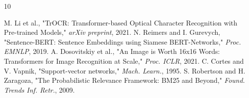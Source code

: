\documentclass[conference]{IEEEtran}
\begin{document}

\begin{thebibliography}{10}

 M. Li et al., "TrOCR: Transformer-based Optical Character Recognition with Pre-trained Models," \textit{arXiv preprint}, 2021.
 N. Reimers and I. Gurevych, "Sentence-BERT: Sentence Embeddings using Siamese BERT-Networks," \textit{Proc. EMNLP}, 2019.
 A. Dosovitskiy et al., "An Image is Worth 16x16 Words: Transformers for Image Recognition at Scale," \textit{Proc. ICLR}, 2021.
 C. Cortes and V. Vapnik, "Support-vector networks," \textit{Mach. Learn.}, 1995.
 S. Robertson and H. Zaragoza, "The Probabilistic Relevance Framework: BM25 and Beyond," \textit{Found. Trends Inf. Retr.}, 2009.

\end{thebibliography}
\end{document}
